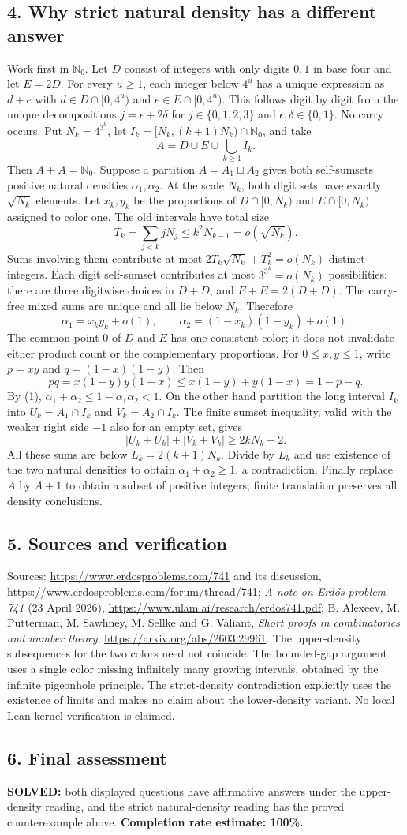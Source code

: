 \subsection*{4. Why strict natural density has a different answer}
Work first in $\mathbb N_0$. Let $D$ consist of integers with only digits $0,1$ in base four and let $E=2D$. For every $u\ge1$, each integer below $4^u$ has a unique expression as $d+e$ with $d\in D\cap[0,4^u)$ and $e\in E\cap[0,4^u)$. This follows digit by digit from the unique decompositions $j=\epsilon+2\delta$ for $j\in\{0,1,2,3\}$ and $\epsilon,\delta\in\{0,1\}$. No carry occurs.
Put $N_k=4^{3^k}$, let $I_k=[N_k,(k+1)N_k)\cap\mathbb N_0$, and take
\[
 A=D\cup E\cup\bigcup_{k\ge1}I_k.
\]
Then $A+A=\mathbb N_0$. Suppose a partition $A=A_1\sqcup A_2$ gives both self-sumsets positive natural densities $\alpha_1,\alpha_2$.
At the scale $N_k$, both digit sets have exactly $\sqrt{N_k}$ elements. Let $x_k,y_k$ be the proportions of $D\cap[0,N_k)$ and $E\cap[0,N_k)$ assigned to color one. The old intervals have total size
\[
 T_k=\sum_{j<k}jN_j\le k^2N_{k-1}=o(\sqrt{N_k}).
\]
Sums involving them contribute at most $2T_k\sqrt{N_k}+T_k^2=o(N_k)$ distinct integers. Each digit self-sumset contributes at most $3^{3^k}=o(N_k)$ possibilities: there are three digitwise choices in $D+D$, and $E+E=2(D+D)$. The carry-free mixed sums are unique and all lie below $N_k$. Therefore
\[
 \alpha_1=x_ky_k+o(1),\qquad
 \alpha_2=(1-x_k)(1-y_k)+o(1). \tag{1}
\]
The common point $0$ of $D$ and $E$ has one consistent color; it does not invalidate either product count or the complementary proportions.
For $0\le x,y\le1$, write $p=xy$ and $q=(1-x)(1-y)$. Then
\[
 pq=x(1-y)y(1-x)\le x(1-y)+y(1-x)=1-p-q.
\]
By (1), $\alpha_1+\alpha_2\le1-\alpha_1\alpha_2<1$.
On the other hand partition the long interval $I_k$ into $U_k=A_1\cap I_k$ and $V_k=A_2\cap I_k$. The finite sumset inequality, valid with the weaker right side $-1$ also for an empty set, gives
\[
 |U_k+U_k|+|V_k+V_k|\ge2kN_k-2.
\]
All these sums are below $L_k=2(k+1)N_k$. Divide by $L_k$ and use existence of the two natural densities to obtain $\alpha_1+\alpha_2\ge1$, a contradiction. Finally replace $A$ by $A+1$ to obtain a subset of positive integers; finite translation preserves all density conclusions.
\subsection*{5. Sources and verification}
Sources: \url{https://www.erdosproblems.com/741} and its discussion, \url{https://www.erdosproblems.com/forum/thread/741}; \emph{A note on Erd\H{o}s problem 741} (23 April 2026), \url{https://www.ulam.ai/research/erdos741.pdf}; B. Alexeev, M. Putterman, M. Sawhney, M. Sellke and G. Valiant, \emph{Short proofs in combinatorics and number theory}, \url{https://arxiv.org/abs/2603.29961}.
The upper-density subsequences for the two colors need not coincide. The bounded-gap argument uses a single color missing infinitely many growing intervals, obtained by the infinite pigeonhole principle. The strict-density contradiction explicitly uses the existence of limits and makes no claim about the lower-density variant. No local Lean kernel verification is claimed.
\subsection*{6. Final assessment}
\textbf{SOLVED:} both displayed questions have affirmative answers under the upper-density reading, and the strict natural-density reading has the proved counterexample above.
\textbf{Completion rate estimate: 100\%.}
